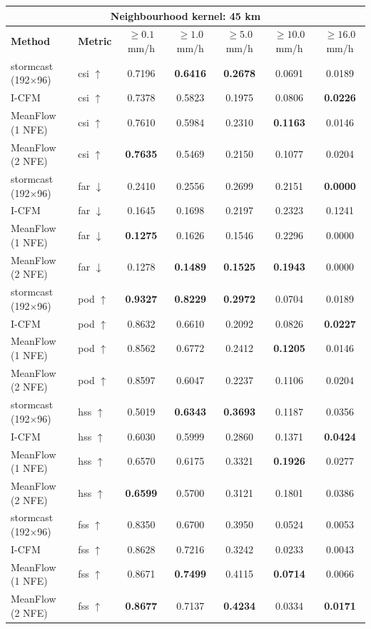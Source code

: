 \documentclass[border=10pt]{standalone}
\begin{document}
\begin{tabular}{llccccc}
\toprule
\multicolumn{7}{c}{\textbf{Neighbourhood kernel: 45 km}} \\
\midrule
\textbf{Method} & \textbf{Metric} & $\geq 0.1$ mm/h & $\geq 1.0$ mm/h & $\geq 5.0$ mm/h & $\geq 10.0$ mm/h & $\geq 16.0$ mm/h \\
\midrule
stormcast (192$\times$96) & csi $\uparrow$ & 0.7196 & \textbf{0.6416} & \textbf{0.2678} & 0.0691 & 0.0189 \\
I-CFM & csi $\uparrow$ & 0.7378 & 0.5823 & 0.1975 & 0.0806 & \textbf{0.0226} \\
MeanFlow (1 NFE) & csi $\uparrow$ & 0.7610 & 0.5984 & 0.2310 & \textbf{0.1163} & 0.0146 \\
MeanFlow (2 NFE) & csi $\uparrow$ & \textbf{0.7635} & 0.5469 & 0.2150 & 0.1077 & 0.0204 \\
\midrule
stormcast (192$\times$96) & far $\downarrow$ & 0.2410 & 0.2556 & 0.2699 & 0.2151 & \textbf{0.0000} \\
I-CFM & far $\downarrow$ & 0.1645 & 0.1698 & 0.2197 & 0.2323 & 0.1241 \\
MeanFlow (1 NFE) & far $\downarrow$ & \textbf{0.1275} & 0.1626 & 0.1546 & 0.2296 & 0.0000 \\
MeanFlow (2 NFE) & far $\downarrow$ & 0.1278 & \textbf{0.1489} & \textbf{0.1525} & \textbf{0.1943} & 0.0000 \\
\midrule
stormcast (192$\times$96) & pod $\uparrow$ & \textbf{0.9327} & \textbf{0.8229} & \textbf{0.2972} & 0.0704 & 0.0189 \\
I-CFM & pod $\uparrow$ & 0.8632 & 0.6610 & 0.2092 & 0.0826 & \textbf{0.0227} \\
MeanFlow (1 NFE) & pod $\uparrow$ & 0.8562 & 0.6772 & 0.2412 & \textbf{0.1205} & 0.0146 \\
MeanFlow (2 NFE) & pod $\uparrow$ & 0.8597 & 0.6047 & 0.2237 & 0.1106 & 0.0204 \\
\midrule
stormcast (192$\times$96) & hss $\uparrow$ & 0.5019 & \textbf{0.6343} & \textbf{0.3693} & 0.1187 & 0.0356 \\
I-CFM & hss $\uparrow$ & 0.6030 & 0.5999 & 0.2860 & 0.1371 & \textbf{0.0424} \\
MeanFlow (1 NFE) & hss $\uparrow$ & 0.6570 & 0.6175 & 0.3321 & \textbf{0.1926} & 0.0277 \\
MeanFlow (2 NFE) & hss $\uparrow$ & \textbf{0.6599} & 0.5700 & 0.3121 & 0.1801 & 0.0386 \\
\midrule
stormcast (192$\times$96) & fss $\uparrow$ & 0.8350 & 0.6700 & 0.3950 & 0.0524 & 0.0053 \\
I-CFM & fss $\uparrow$ & 0.8628 & 0.7216 & 0.3242 & 0.0233 & 0.0043 \\
MeanFlow (1 NFE) & fss $\uparrow$ & 0.8671 & \textbf{0.7499} & 0.4115 & \textbf{0.0714} & 0.0066 \\
MeanFlow (2 NFE) & fss $\uparrow$ & \textbf{0.8677} & 0.7137 & \textbf{0.4234} & 0.0334 & \textbf{0.0171} \\
\bottomrule
\end{tabular}
\end{document}
